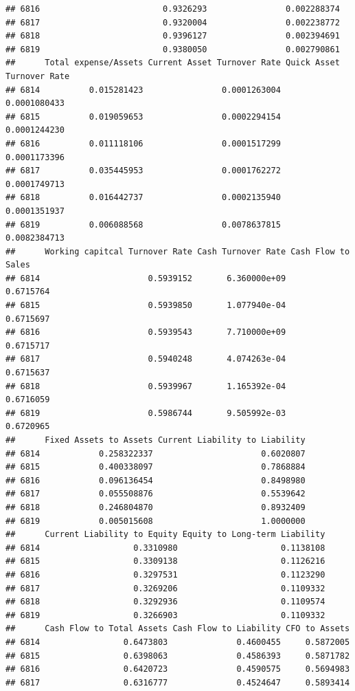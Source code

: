 \documentclass[
]{book}
\begin{document}
\begin{verbatim}
## 6816                         0.9326293                0.002288374
## 6817                         0.9320004                0.002238772
## 6818                         0.9396127                0.002394691
## 6819                         0.9380050                0.002790861
##      Total expense/Assets Current Asset Turnover Rate Quick Asset Turnover Rate
## 6814          0.015281423                0.0001263004              0.0001080433
## 6815          0.019059653                0.0002294154              0.0001244230
## 6816          0.011118106                0.0001517299              0.0001173396
## 6817          0.035445953                0.0001762272              0.0001749713
## 6818          0.016442737                0.0002135940              0.0001351937
## 6819          0.006088568                0.0078637815              0.0082384713
##      Working capitcal Turnover Rate Cash Turnover Rate Cash Flow to Sales
## 6814                      0.5939152       6.360000e+09          0.6715764
## 6815                      0.5939850       1.077940e-04          0.6715697
## 6816                      0.5939543       7.710000e+09          0.6715717
## 6817                      0.5940248       4.074263e-04          0.6715637
## 6818                      0.5939967       1.165392e-04          0.6716059
## 6819                      0.5986744       9.505992e-03          0.6720965
##      Fixed Assets to Assets Current Liability to Liability
## 6814            0.258322337                      0.6020807
## 6815            0.400338097                      0.7868884
## 6816            0.096136454                      0.8498980
## 6817            0.055508876                      0.5539642
## 6818            0.246804870                      0.8932409
## 6819            0.005015608                      1.0000000
##      Current Liability to Equity Equity to Long-term Liability
## 6814                   0.3310980                     0.1138108
## 6815                   0.3309138                     0.1126216
## 6816                   0.3297531                     0.1123290
## 6817                   0.3269206                     0.1109332
## 6818                   0.3292936                     0.1109574
## 6819                   0.3266903                     0.1109332
##      Cash Flow to Total Assets Cash Flow to Liability CFO to Assets
## 6814                 0.6473803              0.4600455     0.5872005
## 6815                 0.6398063              0.4586393     0.5871782
## 6816                 0.6420723              0.4590575     0.5694983
## 6817                 0.6316777              0.4524647     0.5893414

\end{verbatim}
\end{document}
